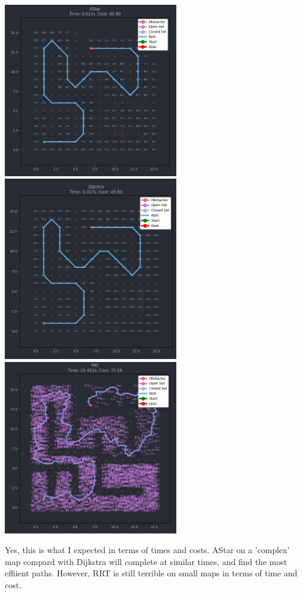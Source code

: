 \documentclass{article}
\begin{document}
    \begin{center}
        \includegraphics[width=3in]{AStar.png}
        \includegraphics[width=3in]{Dijkstra.png} 
        \includegraphics[width=3in]{RRT.png}
    \end{center}
    \raggedright
    Yes, this is what I expected in terms of times and costs. AStar on a 'complex' map compard with Dijkstra will complete at similar times, and find the most effiient paths. However, RRT is still terrible on small maps in terms of time and cost.
        
\end{document}
